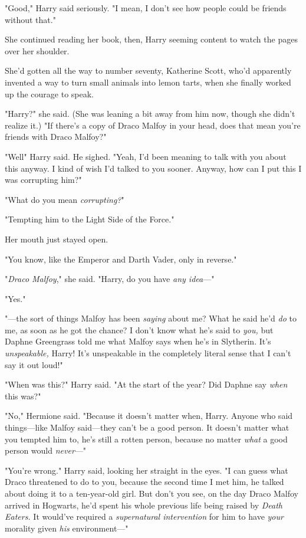 "Good," Harry said seriously. "I mean, I don't see how people could be friends
without that."

She continued reading her book, then, Harry seeming content to watch the pages
over her shoulder.

She'd gotten all the way to number seventy, Katherine Scott, who'd apparently
invented a way to turn small animals into lemon tarts, when she finally worked
up the courage to speak.

"Harry?" she said. (She was leaning a bit away from him now, though she didn't
realize it.) "If there's a copy of Draco Malfoy in your head, does that mean
you're friends with Draco Malfoy?"

"Well{\el}" Harry said. He sighed. "Yeah, I'd been meaning to talk with you
about this anyway. I kind of wish I'd talked to you sooner. Anyway, how can I
put this{\el} I was corrupting him?"

"What do you mean \emph{corrupting?}"

"Tempting him to the Light Side of the Force."

Her mouth just stayed open.

"You know, like the Emperor and Darth Vader, only in reverse."

"\emph{Draco Malfoy}," she said. "Harry, do you have \emph{any idea}\mbox{---}"

"Yes."

"---the sort of things Malfoy has been \emph{saying} about me? What he said
he'd \emph{do} to me, as soon as he got the chance? I don't know what he's said
to \emph{you,} but Daphne Greengrass told me what Malfoy says when he's in
Slytherin. It's \emph{unspeakable,} Harry! It's unspeakable in the completely
literal sense that I can't say it out loud!"

"When was this?" Harry said. "At the start of the year? Did Daphne say
\emph{when} this was?"

"No," Hermione said. "Because it doesn't matter when, Harry. Anyone who said
things---like Malfoy said---they can't be a good person. It doesn't matter what
you tempted him to, he's still a rotten person, because no matter \emph{what} a
good person would \emph{never}\mbox{---}"

"You're wrong." Harry said, looking her straight in the eyes. "I can guess what
Draco threatened to do to you, because the second time I met him, he talked
about doing it to a ten-year-old girl. But don't you see, on the day Draco
Malfoy arrived in Hogwarts, he'd spent his whole previous life being raised by
\emph{Death Eaters.} It would've required a \emph{supernatural intervention}
for him to have \emph{your} morality given \emph{his} environment\mbox{---}"

